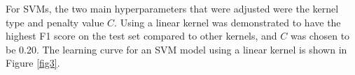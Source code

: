 For SVMs, the two main hyperparameters that were adjusted were the kernel type and penalty value $C$. Using a linear kernel was demonstrated to have the highest F1 score on the test set compared to other kernels, and $C$ was chosen to be 0.20. The learning curve for an SVM model using a linear kernel is shown in Figure \ref{fig3}.